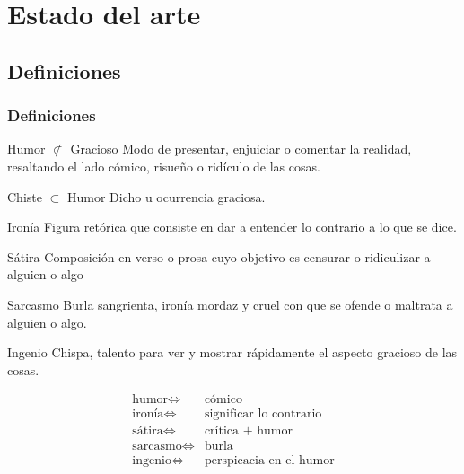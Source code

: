 \section{Estado del arte} %

\subsection{Definiciones}
\begin{frame}[allowframebreaks]
	\frametitle{Definiciones}

	\begin{block}{Humor $\not\subset$ Gracioso}
	Modo de presentar, enjuiciar o comentar la realidad, resaltando el lado cómico, risueño o ridículo de las cosas.  
	\end{block}
	\begin{block}{Chiste $\subset$ Humor}
	Dicho u ocurrencia graciosa.
	\end{block}

	\framebreak

	\begin{block}{Ironía}
		Figura retórica que consiste en dar a entender lo contrario a lo que se dice.
	\end{block}
	\begin{block}{Sátira}
		Composición en verso o prosa cuyo objetivo es censurar o ridiculizar a alguien o algo
	\end{block}
	\begin{block}{Sarcasmo}
		Burla sangrienta, ironía mordaz y cruel con que se ofende o maltrata a alguien o algo.
	\end{block}
	\begin{block}{Ingenio}
		Chispa, talento para ver y mostrar rápidamente el aspecto gracioso de las cosas.
	\end{block}

	\framebreak
		
	\begin{eqnarray*} %
    	\text{humor} \iff&  \text{cómico}\\
	    \text{ironía} \iff& \text{significar lo contrario}\\
	    \text{sátira} \iff& \text{crítica + humor}\\
	    \text{sarcasmo} \iff& \text{burla}\\
	    \text{ingenio}  \iff& \text{perspicacia en el humor}
	\end{eqnarray*}
\end{frame}

